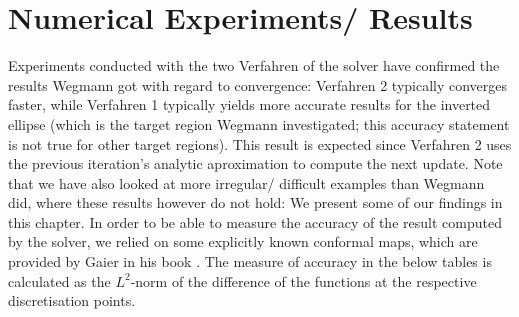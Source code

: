 \section{Numerical Experiments/ Results}\label{chap:experiments}

Experiments conducted with the two Verfahren of the solver have confirmed the results Wegmann got with regard to convergence: Verfahren 2 typically converges faster, while Verfahren 1 typically yields more accurate results for the inverted ellipse (which is the target region Wegmann investigated; this accuracy statement is not true for other target regions)\cite[§5, last paragraph]{Wegmann1978_newtonverfahren}. This result is expected since Verfahren 2 uses the previous iteration's analytic aproximation to compute the next update. 
Note that we have also looked at more irregular/ difficult examples than Wegmann did, where these results however do not hold:
We present some of our findings in this chapter.
In order to be able to measure the accuracy of the result computed by the solver, we relied on some explicitly known conformal maps, which are provided by Gaier in his book \cite[Anhang 5, p. 264]{Gaier1964}. 
The measure of accuracy in the below tables is calculated as the $L^2$-norm of the difference of the functions at the respective discretisation points.

\newpage
